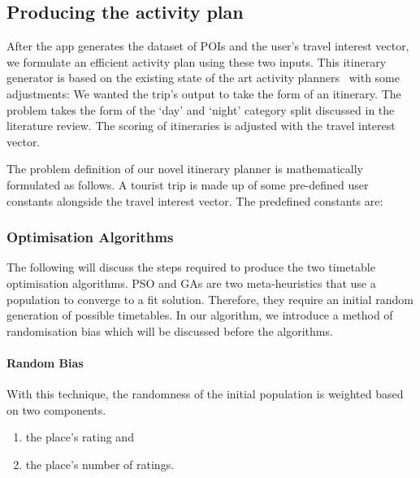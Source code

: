 

\subsection{Producing the activity plan}

After the app generates the dataset of POIs and the
user's travel interest vector, we formulate an
efficient activity plan using these two inputs. This
itinerary generator is based on the existing state of
the art activity planners~\cite{Sylejmani2017, Wisittipanich2020}
with some adjustments: We wanted the trip's output to take the
form of an itinerary.  The problem takes the form of
the `day' and `night'  category split discussed in
the literature review.  The scoring of itineraries is adjusted
with the travel interest vector.

The problem definition of our novel itinerary planner
is mathematically formulated as follows. A tourist trip is made up
of some pre-defined user constants alongside the travel interest
vector. The predefined constants are:
\\


%

\subsubsection{Optimisation Algorithms}

The following will discuss the steps required to
produce the two timetable optimisation algorithms. PSO
and GAs are two meta-heuristics that use a population
to converge to a fit solution. Therefore, they require
an initial random generation of possible timetables. In
our algorithm, we introduce a method of randomisation
bias which will be discussed before the algorithms.


\paragraph{Random Bias}
With this technique, the randomness of the initial
population is weighted based on two components.
\begin{enumerate}

    \item  the place's rating and 

    \item the place's number of ratings.
\end{enumerate}


